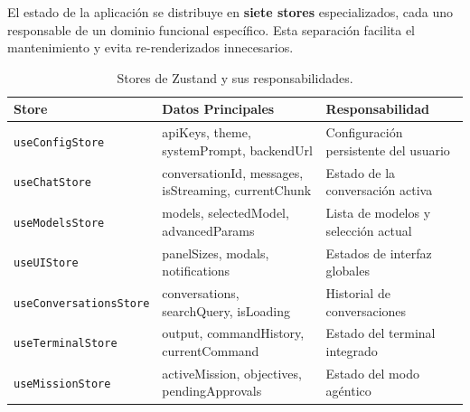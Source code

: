 El estado de la aplicación se distribuye en \textbf{siete stores} especializados, cada uno responsable de un dominio funcional específico. Esta separación facilita el mantenimiento y evita re-renderizados innecesarios.

\begin{table}[H]
\centering
\renewcommand{\arraystretch}{1.2}
\small
\begin{tabular}{|l|p{4cm}|p{5.5cm}|}
\hline
\rowcolor[gray]{0.85}
\textbf{Store} & \textbf{Datos Principales} & \textbf{Responsabilidad} \\
\hline
\texttt{useConfigStore} & apiKeys, theme, systemPrompt, backendUrl & Configuración persistente del usuario \\
\hline
\texttt{useChatStore} & conversationId, messages, isStreaming, currentChunk & Estado de la conversación activa \\
\hline
\texttt{useModelsStore} & models, selectedModel, advancedParams & Lista de modelos y selección actual \\
\hline
\texttt{useUIStore} & panelSizes, modals, notifications & Estados de interfaz globales \\
\hline
\texttt{useConversationsStore} & conversations, searchQuery, isLoading & Historial de conversaciones \\
\hline
\texttt{useTerminalStore} & output, commandHistory, currentCommand & Estado del terminal integrado \\
\hline
\texttt{useMissionStore} & activeMission, objectives, pendingApprovals & Estado del modo agéntico \\
\hline
\end{tabular}
\caption{Stores de Zustand y sus responsabilidades.}
\label{tab:stores_zustand}
\end{table}

